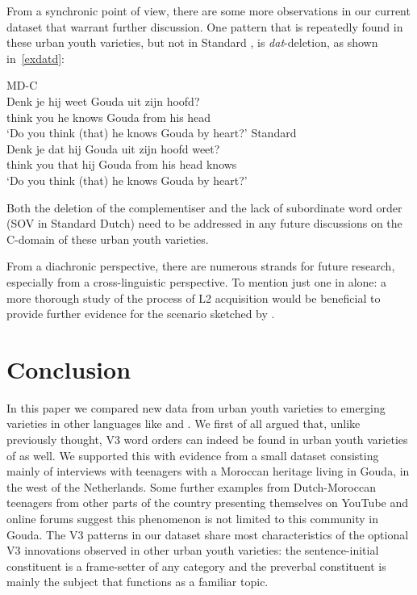 \documentclass[output=paper]{langsci/langscibook}
\begin{document}
From a synchronic point of view, there are some more observations in our
current dataset that warrant further discussion. One pattern that is repeatedly
found in these urban youth varieties, but not in Standard , is
\emph{dat}-deletion, as shown in~\eqref{exdatd}:\largerpage

\ea
    \ea\label{exdatd} MD-C\\
    \gll Denk je hij weet Gouda uit zijn hoofd?\\
    think you he knows Gouda from his head\\
    \trans \enquote*{Do you think (that) he knows Gouda by heart?}
    \ex Standard \\
    \gll Denk je dat hij Gouda uit zijn hoofd weet?\\
    think you that hij Gouda from his head knows\\
    \trans \enquote*{Do you think (that) he knows Gouda by heart?}
    \z
\z

\noindent Both the deletion of the complementiser and the lack of subordinate
word order (SOV in Standard Dutch) need to be addressed in any future
discussions on the C-domain of these urban youth varieties.

From a diachronic perspective, there are numerous strands for future research,
especially from a cross-linguistic perspective. To mention just one in 
alone: a more thorough study of the process of L2 acquisition would be
beneficial to provide further evidence for the scenario sketched by
\citet{Walkden:2017}.

\section{Conclusion}
\label{sec:con}


\noindent In this paper we compared new data from  urban youth varieties
to emerging varieties in other  languages like  and . We
first of all argued that, unlike previously thought, V3 word orders can indeed
be found in urban youth varieties of  as well. We supported this with
evidence from a small dataset consisting mainly of interviews with teenagers
with a Moroccan heritage living in Gouda, in the west of the Netherlands. Some
further examples from Dutch-Moroccan teenagers from other parts of the country
presenting themselves on YouTube and online forums suggest this phenomenon is
not limited to this community in Gouda. The V3 patterns in our dataset share
most characteristics of the optional V3 innovations observed in other 
urban youth varieties: the sentence-initial constituent is a frame-setter of
any category and the preverbal constituent is mainly the subject that functions
as a familiar topic.
\end{document}
